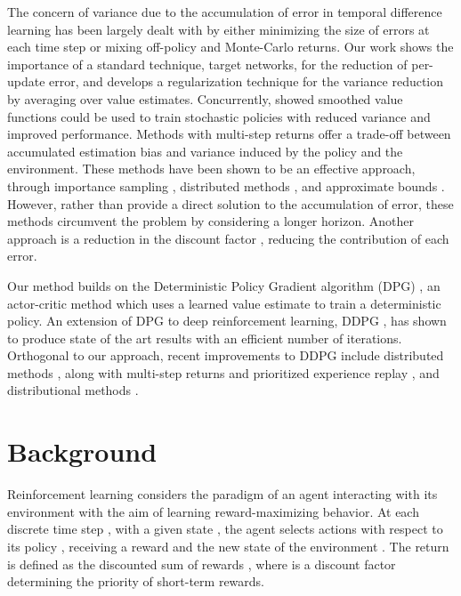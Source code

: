 \documentclass{article}
\begin{document}
The concern of variance due to the accumulation of error in temporal difference learning has been largely dealt with by either minimizing the size of errors at each time step or mixing off-policy and Monte-Carlo returns. Our work shows the importance of a standard technique, target networks, for the reduction of per-update error, and develops a regularization technique for the variance reduction by averaging over value estimates. Concurrently, \citet{Smoothie} showed smoothed value functions could be used to train stochastic policies with reduced variance and improved performance. Methods with multi-step returns offer a trade-off between accumulated estimation bias and variance induced by the policy and the environment. These methods have been shown to be an effective approach, through importance sampling \cite{precup2001off, munos2016safe}, distributed methods \cite{a3c,espeholt2018impala}, and approximate bounds \cite{optimalitytightening}. However, rather than provide a direct solution to the accumulation of error, these methods circumvent the problem by considering a longer horizon. Another approach is a reduction in the discount factor \cite{petrik2009discount}, reducing the contribution of each error.

Our method builds on the Deterministic Policy Gradient algorithm (DPG) \citep{DPG}, an actor-critic method which uses a learned value estimate to train a deterministic policy. An extension of DPG to deep reinforcement learning, DDPG \cite{DDPG}, has shown to produce state of the art results with an efficient number of iterations.
Orthogonal to our approach, recent improvements to DDPG include distributed methods \cite{popov2017data}, along with multi-step returns and prioritized experience replay \cite{PrioritizedExpReplay, horgan2018distributed}, and distributional methods \cite{bellemare2017distributional, barth-maron2018distributional}. 


\section{Background}


Reinforcement learning considers the paradigm of an agent interacting with its environment with the aim of learning reward-maximizing behavior. At each discrete time step , with a given state , the agent selects actions  with respect to its policy , receiving a reward  and the new state of the environment . The return is defined as the discounted sum of rewards , where  is a discount factor determining the priority of short-term rewards. 
\end{document}
